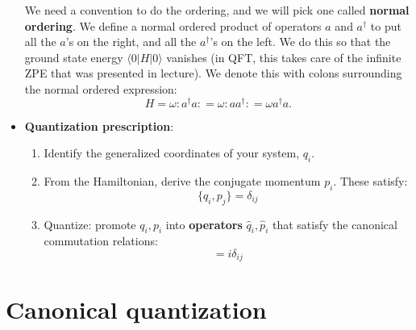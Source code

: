 \documentclass[12pt, oneside]{article}   	%
\theoremstyle{definition}
\begin{document}
\begin{itemize}
	We need a convention to do the ordering, and we will pick one called \textbf{normal ordering}. We define a normal ordered product of operators $a$ and $a^\dagger$ to put all the $a$'s on the right, and all the $a^\dagger$'s on the left. We do this so that the ground state energy $\langle 0 | H | 0\rangle$ vanishes (in QFT, this takes care of the infinite ZPE that was presented in lecture). We denote this with colons surrounding the normal ordered expression:
	\begin{equation}
		H = \omega :a^\dagger a: = \omega :aa^\dagger : = \omega a^\dagger a.
	\end{equation}
	
	\item \textbf{Quantization prescription}: 
	\begin{enumerate}
		\item Identify the generalized coordinates of your system, $q_i$.
		\item From the Hamiltonian, derive the conjugate momentum $p_i$. These satisfy:
		\begin{equation}
			\{q_i, p_j\} = \delta_{ij}
		\end{equation}
		\item Quantize: promote $q_i, p_i$ into \textbf{operators} $\hat q_i, \hat p_i$ that satisfy the canonical commutation relations:
		\begin{equation}
			[\hat{q}_i, \hat{p}_j] = i\delta_{ij}
		\end{equation}
	\end{enumerate}
	
\end{itemize}

\section*{Canonical quantization}

\end{document}

